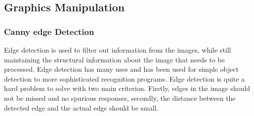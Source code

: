 \subsection{Graphics Manipulation}
\subsubsection{Canny edge Detection}
Edge detection is used to filter out information from the images, while still maintaining the structural information about the image that needs to be processed. Edge detection has many uses and has been used for simple object detection to more sophisticated recognition programs\cite{acronym}. Edge detection is quite a hard problem to solve with two main criterion. Firstly, edges in the image should not be missed and no spurious responses, secondly, the distance between the detected edge and the actual edge should be small\cite{canny-paper}.

